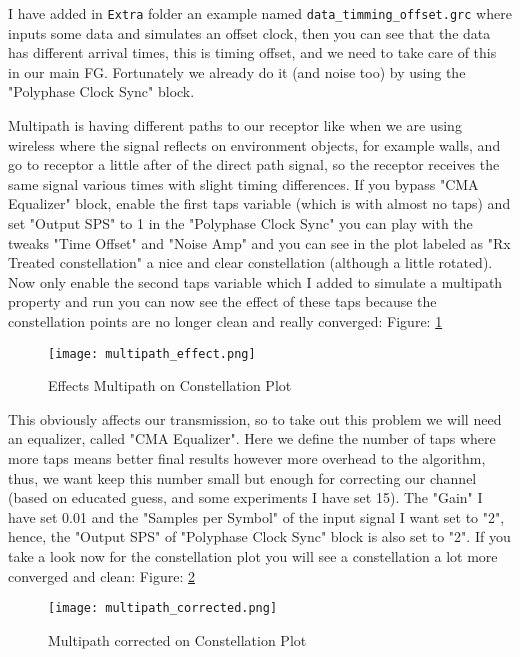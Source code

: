 \documentclass[a4paper, 10pt, conference]{ieeeconf}      %
\begin{document}
    I have added in \verb|Extra| folder an example named \verb|data_timming_offset.grc| where inputs some data and simulates an offset clock, then you can see that the data has different arrival times, this is timing offset, and we need to take care of this in our main FG. Fortunately we already do it (and noise too) by using the "Polyphase Clock Sync" block. 
    
    
    Multipath is having different paths to our receptor like when we are using wireless where the signal reflects on environment objects, for example walls, and go to receptor a little after of the direct path signal, so the receptor receives the same signal various times with slight timing differences. 
    If you bypass "CMA Equalizer" block, enable the first taps variable (which is with almost no taps) and set "Output SPS" to 1 in the "Polyphase Clock Sync" you can play with the tweaks "Time Offset" and "Noise Amp" and you can see in the plot labeled as "Rx Treated constellation" a nice and clear constellation (although a little rotated). Now only enable the second taps variable which I added to simulate a multipath property and run you can now see the effect of these taps because the constellation points are no longer clean and really converged: Figure:  \ref{fig:multipath_effect}
    
    \begin{figure}
        \centering
        \texttt{[image: multipath\_effect.png]}
        \caption{Effects Multipath on Constellation Plot}
        \label{fig:multipath_effect}
    \end{figure}

    This obviously affects our transmission, so to take out this problem we will need an equalizer, called "CMA Equalizer". Here we define the number of taps where more taps means better final results however more overhead to the algorithm, thus, we want keep this number small but enough for correcting our channel (based on educated guess, and some experiments I have set 15). The "Gain" I have set 0.01 and the "Samples per Symbol" of the input signal I want set to "2", hence, the "Output SPS" of "Polyphase Clock Sync" block is also set to "2". If you take a look now for the constellation plot you will see a constellation a lot more converged and clean: Figure: \ref{fig:multipath_corrected}

    \begin{figure}
        \centering
        \texttt{[image: multipath\_corrected.png]}
        \caption{Multipath corrected on Constellation Plot}
        \label{fig:multipath_corrected}
    \end{figure}
    
\end{document}
